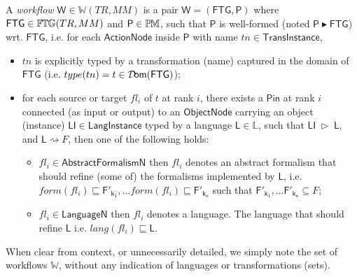 \begin{Definition}
   A \emph{workflow} $\mathsf{W}\in\mathbb{W}(TR, MM)$ is a pair $\mathsf{W} = 
(\mathsf{FTG}, \mathsf{P})$ where $\mathsf{FTG}\in\mathbb{F}\mskip-1mu\mathbb{T}\mskip-1mu\mathbb{G}(TR, MM)$ and 
$\mathsf{P}\in\mathbb{P}\mskip-1mu\mathbb{M}$, such that $\mathsf{P}$ is well-formed (noted 
$\mathsf{P} \blacktriangleright \mathsf{FTG}$) wrt. $\mathsf{FTG}$, i.e. for 
each $\mathsf{ActionNode}$ inside $\mathsf{P}$ with name 
$tn\in\mathsf{TransInstance}$,
\begin{itemize}
   \item $tn$ is explicitly typed by a transformation (name) captured in the 
domain of $\mathsf{FTG}$ (i.e. $type(tn) = t \in \mathsf{\mathcal{D}\!om}(\mathsf{FTG})$);

   \item for each source or target $fl_i$ of $t$ at rank $i$, there exists a 
$\mathsf{Pin}$ at rank $i$ connected (as input or output) to an 
$\mathsf{ObjectNode}$ carrying an object (instance) $\mathsf{LI}\in 
\mathsf{LangInstance}$ typed by a language $\mathsf{L}\in\mathbb{L}$, such that 
$\mathsf{LI} \;\rhd\; \mathsf{L}$, and $\mathsf{L}\rightsquigarrow F$, then one 
of the following holds:
   \begin{itemize}
      \item $fl_i\in \mathsf{AbstractFormalismN}$ then $fl_i$ denotes an 
abstract formalism that should refine (some 
of) the formalisms implemented by $\mathsf{L}$, i.e. $form(fl_i) \sqsubseteq 
\mathsf{F'_{k_1}}, \ldots form(fl_i) \sqsubseteq \mathsf{F'_{k_n}}$ such that 
$\mathsf{F'_{k_1}}, \ldots \mathsf{F'_{k_n}} \subseteq F$;
      
      \item $fl_i\in \mathsf{LanguageN}$ then $fl_i$ denotes a language. The 
language that should refine $\mathsf{L}$ i.e. $lang(fl_i) \sqsubseteq 
\mathsf{L}$.
   \end{itemize}
\end{itemize}
\end{Definition}
\noindent
When clear from context, or unnecessarily detailed, we simply note the set of 
workflows $\mathbb{W}$, without any indication of languages or 
transformations (sets).


